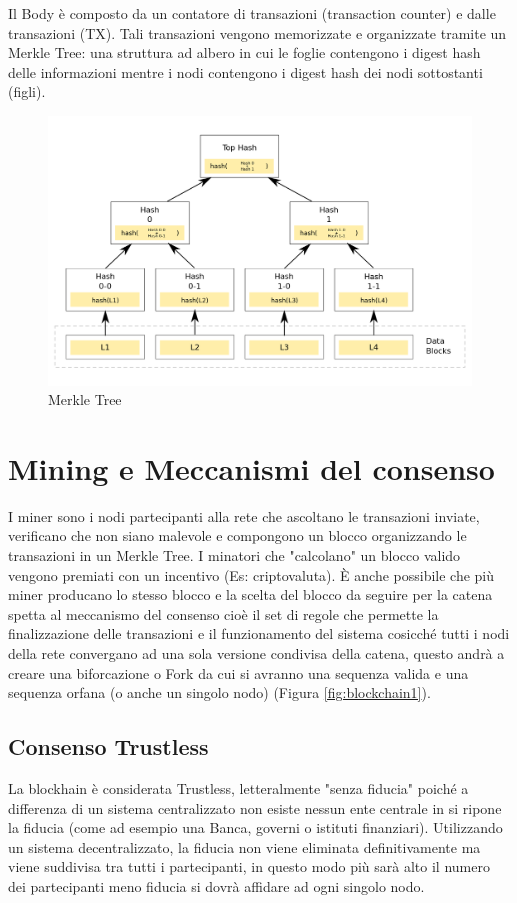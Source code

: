 \documentclass[11pt,a4paper,titlepage,twoside,openright]{report}
\begin{document}
Il Body è composto da un contatore di transazioni (transaction counter) e dalle transazioni (TX). Tali transazioni vengono memorizzate e organizzate tramite un Merkle Tree: una struttura ad albero in cui le foglie contengono i digest hash delle informazioni mentre i nodi contengono i digest hash dei nodi sottostanti (figli).
\begin{figure}[h]
	\includegraphics[width=\textwidth]{Hash_Tree}
	\centering
	\caption{Merkle Tree}
	\label{fig:Tree1}
\end{figure}

\section{Mining e Meccanismi del consenso}
I miner sono i nodi partecipanti alla rete che  ascoltano le transazioni inviate, verificano che non siano malevole e compongono un blocco organizzando le transazioni in un Merkle Tree.
I minatori che "calcolano" un blocco valido vengono premiati con un incentivo (Es: criptovaluta).
È anche possibile che più miner producano lo stesso blocco e la scelta del blocco da seguire per la catena spetta al meccanismo del consenso cioè il set di regole che permette la finalizzazione delle transazioni e il funzionamento del sistema cosicché tutti i nodi della rete convergano ad una sola versione condivisa della catena, questo andrà a creare una biforcazione o Fork da cui si avranno una sequenza valida e una sequenza orfana (o anche un singolo nodo) (Figura \ref{fig:blockchain1}).

\subsection{Consenso Trustless}
La blockhain è considerata Trustless, letteralmente "senza fiducia" poiché a differenza di un sistema centralizzato non esiste nessun ente centrale in si ripone la fiducia (come ad esempio una Banca, governi o istituti finanziari). Utilizzando un sistema decentralizzato, la fiducia non viene eliminata definitivamente ma viene suddivisa tra tutti i partecipanti, in questo modo più sarà alto il numero dei partecipanti meno fiducia si dovrà affidare ad ogni singolo nodo. %
\end{document}
